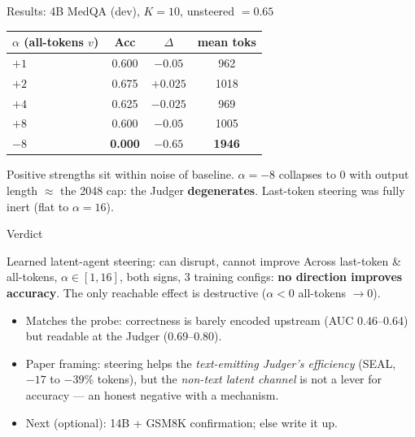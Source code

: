 \documentclass{beamer}
\begin{document}
\begin{frame}{Results: 4B MedQA (dev), $K{=}10$, unsteered $=0.65$}
    \small
    \begin{center}
    \begin{tabular}{lccc}
    \toprule
    $\alpha$ (all-tokens $v$) & Acc & $\Delta$ & mean toks \\
    \midrule
    $+1$ & 0.600 & $-0.05$ & 962 \\
    $+2$ & 0.675 & $+0.025$ & 1018 \\
    $+4$ & 0.625 & $-0.025$ & 969 \\
    $+8$ & 0.600 & $-0.05$ & 1005 \\
    \textbf{$-8$} & \textbf{0.000} & \textbf{$-0.65$} & \textbf{1946} \\
    \bottomrule
    \end{tabular}
    \end{center}
    \normalsize
    \vspace{0.15cm}
    Positive strengths sit within noise of baseline. $\alpha{=}-8$ collapses to 0 with
    output length $\approx$ the 2048 cap: the Judger \textbf{degenerates}. Last-token
    steering was fully inert (flat to $\alpha{=}16$).
\end{frame}

\begin{frame}{Verdict}
    \begin{alertblock}{Learned latent-agent steering: can disrupt, cannot improve}
        Across last-token \& all-tokens, $\alpha\in[1,16]$, both signs, 3 training
        configs: \textbf{no direction improves accuracy}. The only reachable effect is
        destructive ($\alpha{<}0$ all-tokens $\to 0$).
    \end{alertblock}
    \begin{itemize}
        \item Matches the probe: correctness is barely encoded upstream
              (AUC 0.46--0.64) but readable at the Judger (0.69--0.80).
        \item Paper framing: steering helps the \emph{text-emitting Judger's efficiency}
              (SEAL, $-17$ to $-39\%$ tokens), but the \emph{non-text latent channel} is
              not a lever for accuracy --- an honest negative with a mechanism.
        \item Next (optional): 14B + GSM8K confirmation; else write it up.
    \end{itemize}
\end{frame}
\end{document}
